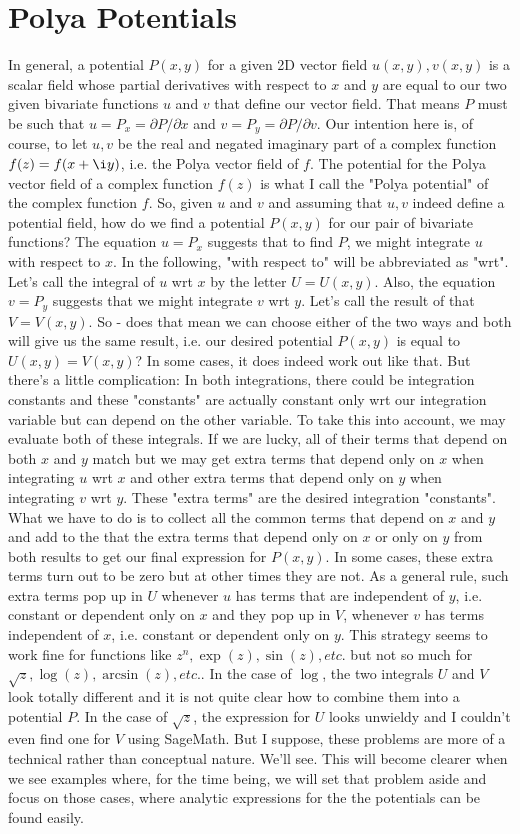 \documentclass[12pt]{article}
\begin{document}
\section{Polya Potentials}
In general, a potential $P(x,y)$ for a given 2D vector field $u(x,y), v(x,y)$ is a scalar field whose partial derivatives with respect to $x$ and $y$ are equal to our two given bivariate functions $u$ and $v$ that define our vector field. That means $P$ must be such that $u = P_x = \partial P / \partial x$ and $v = P_y = \partial P / \partial v$. Our intention here is, of course, to let $u,v$ be the real and negated imaginary part of a complex function $f(z) = f(x + \i y)$, i.e. the Polya vector field of $f$. The potential for the Polya vector field of a complex function $f(z)$ is what I call the "Polya potential" of the complex function $f$. So, given $u$ and $v$ and assuming that $u,v$ indeed define a potential field, how do we find a potential $P(x,y)$ for our pair of bivariate functions? The equation $u = P_x$ suggests that to  find $P$, we might integrate $u$ with respect to $x$. In the following, "with respect to" will be abbreviated as "wrt". Let's call the integral of $u$ wrt $x$ by the letter $U = U(x,y)$. Also, the equation $v = P_y$ suggests that we might integrate $v$ wrt $y$. Let's call the result of that $V = V(x,y)$. So - does that mean we can choose either of the two ways and both will give us the same result, i.e. our desired potential $P(x,y)$ is equal to $U(x,y) = V(x,y)$? In some cases, it does indeed work out like that. But there's a little complication: In both integrations, there could be integration constants and these "constants" are actually constant only wrt our integration variable but can depend on the other variable. To take this into account, we may evaluate both of these integrals. If we are lucky, all of their terms that depend on both $x$ and $y$ match but we may get extra terms that depend only on $x$ when integrating $u$ wrt $x$ and other extra terms that depend only on $y$ when integrating $v$ wrt $y$. These "extra terms" are the desired integration "constants". What we have to do is to collect all the common terms that depend on $x$ and $y$ and add to the that the extra terms that depend only on $x$ or only on $y$ from both results to get our final expression for $P(x,y)$. In some cases, these extra terms turn out to be zero but at other times they are not. As a general rule, such extra terms pop up in $U$ whenever $u$ has terms that are independent of $y$, i.e. constant or dependent only on $x$ and they pop up in $V$, whenever $v$ has terms independent of $x$, i.e. constant or dependent only on $y$. This strategy seems to work fine for functions like $z^n, \exp(z), \sin(z), etc.$ but not so much for $\sqrt{z}, \log(z), \arcsin(z), etc.$. In the case of $\log$, the two integrals $U$ and $V$ look totally different and it is not quite clear how to combine them into a potential $P$. In the case of $\sqrt{z}$, the expression for $U$ looks unwieldy and I couldn't even find one for $V$ using SageMath. But I suppose, these problems are more of a technical rather than conceptual nature. We'll see. This will become clearer when we see examples where, for the time being, we will set that problem aside and focus on those cases, where analytic expressions for the the potentials can be found easily. 
\end{document}
